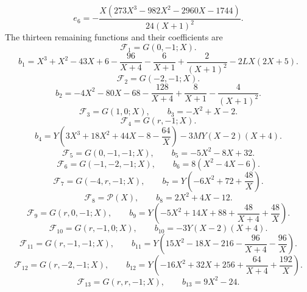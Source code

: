 \begin{equation}
e_{6}=- \frac{X \left(273 X^{3} - 982 X^{2} - 2960 X - 1744\right)}{24 \left(X + 1\right)^{2}}.
\end{equation}
The thirteen remaining functions and their coefficients are
\begin{equation}
\mathcal F_{1}=G(0,-1;X).
\end{equation}
\begin{equation}
b_{1}=X^{3} + X^{2} - 43 X + 6 - \frac{96}{X + 4} - \frac{6}{X + 1} + \frac{2}{\left(X + 1\right)^{2}}- 2 L X \left(2 X + 5\right).
\end{equation}
\begin{equation}
\mathcal F_{2}=G(-2,-1;X).
\end{equation}
\begin{equation}
b_{2}=- 4 X^{2} - 80 X - 68 - \frac{128}{X + 4} + \frac{8}{X + 1} - \frac{4}{\left(X + 1\right)^{2}}.
\end{equation}
\begin{equation}
\mathcal F_{3}=G(1,0;X),\qquad b_{3}=- X^{2} + X - 2.
\end{equation}
\begin{equation}
\mathcal F_{4}=G(r,-1;X).
\end{equation}
\begin{equation}
b_{4}=Y \left(3 X^{3} + 18 X^{2} + 44 X - 8 - \frac{64}{X}\right)- 3 M Y \left(X - 2\right) \left(X + 4\right).
\end{equation}
\begin{equation}
\mathcal F_{5}=G(0,-1,-1;X),\qquad b_{5}=- 5 X^{2} - 8 X + 32.
\end{equation}
\begin{equation}
\mathcal F_{6}=G(-1,-2,-1;X),\qquad b_{6}=8 \left(X^{2} - 4 X - 6\right).
\end{equation}
\begin{equation}
\mathcal F_{7}=G(-4,r,-1;X),\qquad b_{7}=Y \left(- 6 X^{2} + 72 + \frac{48}{X}\right).
\end{equation}
\begin{equation}
\mathcal F_{8}=\mathcal P(X),\qquad b_{8}=2 X^{2} + 4 X - 12.
\end{equation}
\begin{equation}
\mathcal F_{9}=G(r,0,-1;X),\qquad b_{9}=Y \left(- 5 X^{2} + 14 X + 88 + \frac{48}{X + 4} + \frac{48}{X}\right).
\end{equation}
\begin{equation}
\mathcal F_{10}=G(r,-1,0;X),\qquad b_{10}=- 3 Y \left(X - 2\right) \left(X + 4\right).
\end{equation}
\begin{equation}
\mathcal F_{11}=G(r,-1,-1;X),\qquad b_{11}=Y \left(15 X^{2} - 18 X - 216 - \frac{96}{X + 4} - \frac{96}{X}\right).
\end{equation}
\begin{equation}
\mathcal F_{12}=G(r,-2,-1;X),\qquad b_{12}=Y \left(- 16 X^{2} + 32 X + 256 + \frac{64}{X + 4} + \frac{192}{X}\right).
\end{equation}
\begin{equation}
\mathcal F_{13}=G(r,r,-1;X),\qquad b_{13}=9 X^{2} - 24.
\end{equation}

